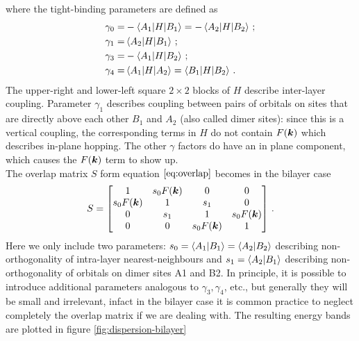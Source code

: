 where the tight-binding parameters are defined as 
\begin{equation}
    \begin{split}
        \gamma_0=&-\braket{A_1|H}{B_1}=-\braket{A_2|H}{B_2}\,; \\
        \gamma_1=&\braket{A_2|H}{B_1} \,; \\
        \gamma_3=&-\braket{A_1|H}{B_2} \,; \\
        \gamma_4=& \braket{A_1|H}{A_2}=\braket{B_1|H}{B_2}\,. \\
    \end{split}
\end{equation}
The upper-right and lower-left square $2\times 2$ blocks of $H$ describe inter-layer coupling. Parameter $\gamma_1$ describes coupling between pairs of orbitals on sites that are directly above each other $B_1$ and $A_2$ (also called dimer sites): since this is a vertical coupling, the corresponding terms in $H$ do not contain $F(\boldsymbol{k})$ which describes in-plane hopping. The other $\gamma$ factors do have an in plane component, which causes the $F(\boldsymbol{k})$ term to show up.\\
The overlap matrix $S$ form equation $\ref{eq:overlap}$ becomes in the bilayer case
\begin{equation}
    S=
    \begin{bmatrix}
        1 & s_0 F(\boldsymbol{k}) & 0&0\\
        s_0 F(\boldsymbol{k})  &1&s_1&0\\
        0&s_1&1&s_0 F(\boldsymbol{k})\\
        0&0&s_0 F(\boldsymbol{k}) &1
    \end{bmatrix}\,.
\end{equation}
Here we only include two parameters: $s_0 = \braket{A_1}{B_1} = \braket{A_2}{B_2}$ describing non-orthogonality of intra-layer nearest-neighbours and $s_1= \braket{A_2}{B_1}$ describing non-orthogonality of orbitals on dimer sites A1 and B2. In principle, it is possible to introduce additional parameters analogous to $\gamma_3,\gamma_4$, etc., but generally they will be small and irrelevant, infact in the bilayer case it is common practice to neglect completely the overlap matrix if we are dealing with. The resulting energy bands are plotted in figure \ref{fig:dispersion-bilayer}

